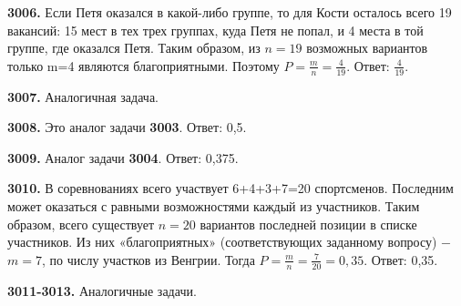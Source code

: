 \textbf{3006.} Если Петя оказался в какой-либо группе, то для Кости осталось всего 19 вакансий: 15 мест в тех трех группах, куда Петя не попал, и 4 места в той группе, где оказался Петя. Таким образом, из $n=19$ возможных вариантов только m=4 являются благоприятными. Поэтому $P=\frac{m}{n}=\frac{4}{19}.$ \newline \null \hspace*{\fill} Ответ: $\frac{4}{19}.$ 

\textbf{3007.} Аналогичная задача.

\textbf{3008.} Это аналог задачи \textbf{3003}. \null \hspace*{\fill} Ответ: 0,5. 

\textbf{3009.} Аналог задачи \textbf{3004}.\newline \null \hspace*{\fill} Ответ: 0,375. 

\textbf{3010.} В соревнованиях всего участвует 6+4+3+7=20 спортсменов. Последним может оказаться с равными возможностями каждый из участников. Таким образом, всего существует $n=20$ вариантов последней позиции в списке участников. Из них «благоприятных» (соответствующих заданному вопросу) $-$ $m=7$, по числу участков из Венгрии. Тогда $P = \frac{m}{n}=\frac{7}{20}=0,35.$\newline \null \hspace*{\fill} Ответ: 0,35. 

\textbf{3011-3013.} Аналогичные задачи.

